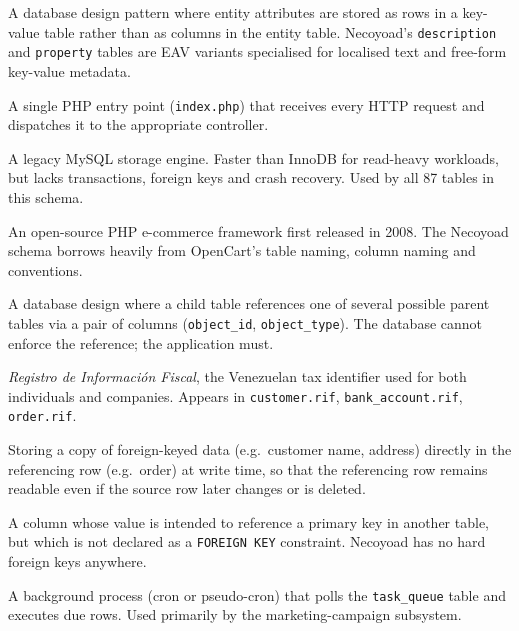 \documentclass[11pt,a4paper]{article}
\begin{document}
\begin{description}[leftmargin=1.6em,itemsep=2pt,font=\bfseries\small]
  \item[EAV (Entity-Attribute-Value)] A database design pattern where
        entity attributes are stored as rows in a key-value table
        rather than as columns in the entity table. Necoyoad's
        \texttt{description} and \texttt{property} tables are EAV
        variants specialised for localised text and free-form
        key-value metadata.
  \item[Front controller] A single PHP entry point (\texttt{index.php})
        that receives every HTTP request and dispatches it to the
        appropriate controller.
  \item[MyISAM] A legacy MySQL storage engine. Faster than InnoDB
        for read-heavy workloads, but lacks transactions, foreign
        keys and crash recovery. Used by all 87 tables in this schema.
  \item[OpenCart] An open-source PHP e-commerce framework first
        released in 2008. The Necoyoad schema borrows heavily from
        OpenCart's table naming, column naming and conventions.
  \item[Polymorphic association] A database design where a child
        table references one of several possible parent tables via
        a pair of columns (\texttt{object\_id}, \texttt{object\_type}).
        The database cannot enforce the reference; the application
        must.
  \item[RIF] \emph{Registro de Informaci\'on Fiscal}, the Venezuelan
        tax identifier used for both individuals and companies.
        Appears in \texttt{customer.rif}, \texttt{bank\_account.rif},
        \texttt{order.rif}.
  \item[Snapshot pattern] Storing a copy of foreign-keyed data
        (e.g.\ customer name, address) directly in the referencing
        row (e.g.\ order) at write time, so that the referencing row
        remains readable even if the source row later changes or
        is deleted.
  \item[Soft foreign key] A column whose value is intended to
        reference a primary key in another table, but which is not
        declared as a \texttt{FOREIGN KEY} constraint. Necoyoad has
        no hard foreign keys anywhere.
  \item[Task scheduler] A background process (cron or pseudo-cron)
        that polls the \texttt{task\_queue} table and executes due
        rows. Used primarily by the marketing-campaign subsystem.
\end{description}
\end{document}
